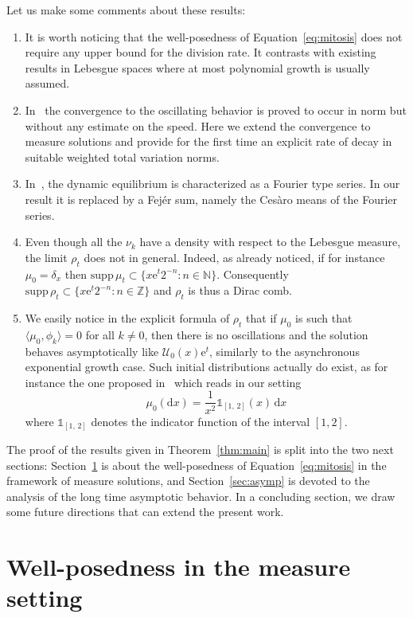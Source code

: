 \documentclass[AHL,Unicode,longabstracts,published]{cedram}
\newcommand{\Ucal}{\mathcal{U}}
\newcommand{\Z}{\mathbb{Z}}
\newcommand{\N}{\mathbb{N}}
\newcommand{\1}{\mathds{1}}
\newcommand{\e}{\mathrm{e}}
\renewcommand{\d}{\mathrm{d}}
\newcommand{\supp}{\mathrm{supp\,}}
\newcommand*{\romanenumi}{\renewcommand*{\theenumi}{\roman{enumi}}}
\begin{document}
Let us make some comments about these results:
\begin{enumerate}\romanenumi
\item It is worth noticing that the well-posedness of Equation~\eqref{eq:mitosis} does not require any upper bound for the division rate. It contrasts with existing results in Lebesgue spaces where at most polynomial growth is usually assumed.
\item In~\cite{vanBrunt2018,BDG,GreinerNagel} the convergence to the oscillating behavior is proved to occur in norm but without any estimate on the speed. Here we extend the convergence to measure solutions and provide for the first time an explicit rate of decay in suitable weighted total variation norms.
\item In~\cite{BDG}, the dynamic equilibrium is characterized as a Fourier type series. In our result it is replaced by a Fejér sum, namely the Cesàro means of the Fourier series.
\item Even though all the $\nu_k$ have a density with respect to the Lebesgue measure, the limit $\rho_t$ does not in general. Indeed, as already noticed, if for instance $\mu_0=\delta_x$ then $\supp\mu_t\subset\{x\e^t2^{-n}: n\in\N\}$. Consequently $\supp\rho_t\subset\{x\e^t2^{-n}: n\in\Z\}$ and $\rho_t$ is thus a Dirac comb.
\item We easily notice in the explicit formula of $\rho_t$ that if $\mu_0$ is such that $\langle\mu_0,\phi_k\rangle=0$ for all $k\neq0$, then there is no oscillations and the solution behaves asymptotically like $\Ucal_0(x)\e^t$, similarly to the asynchronous exponential growth case. Such initial distributions actually do exist, as for instance the one proposed in~\cite{vanBrunt2018} which reads in our setting
\[
\mu_0(\d x)=\frac{1}{x^2}\1_{[1,\,2]}(x)\,\d x
\]
where $\1_{[1,\,2]}$ denotes the indicator function of the interval $[1,2].$
\end{enumerate}




The proof of the results given in Theorem~\ref{thm:main} is split into the two next sections: Section~\ref{sec:wellposedness} is about the well-posedness of Equation~\eqref{eq:mitosis} in the framework of measure solutions, and Section~\ref{sec:asymp} is devoted to the analysis of the long time asymptotic behavior. In a concluding section, we draw some future directions that can extend the present work.


\section{Well-posedness in the measure setting} \label{sec:wellposedness}
\end{document}
